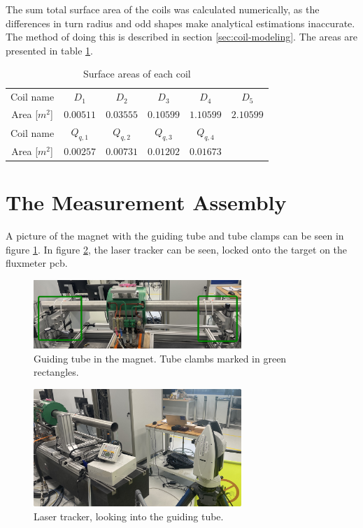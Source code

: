 The sum total surface area of the coils was calculated numerically, as
the differences in turn radius and odd shapes make analytical
estimations inaccurate. The method of doing this is described in 
section \ref{sec:coil-modeling}. The areas are presented in table
\ref{tab:coil-areas}.
\begin{table}[h!]
    \begin{center}
        \begin{tabular}{c c c c c c}
            Coil name & $D_1$ & $D_2$ & $D_3$ & $D_4$ & $D_5$ \\
            Area [$m^2$] & $0.00511$ & $0.03555$ & $0.10599$ & $1.10599$ & $2.10599$ \\
            \hline
            Coil name & $Q_{q,1}$ & $Q_{q,2}$ & $Q_{q,3}$ & $Q_{q,4}$ & \\
            Area [$m^2$] & $0.00257$ & $0.00731$ & $0.01202$ & $0.01673$ &
        \end{tabular}
        \caption{Surface areas of each coil}
        \label{tab:coil-areas}
    \end{center}
\end{table}




\section{The Measurement Assembly}
A picture of the magnet with the guiding tube and tube clamps can be seen in
figure \ref{fig:magnetassembly}. In figure \ref{fig:leica}, the laser tracker
can be seen, locked onto the target on the fluxmeter pcb.

\begin{figure}[!h]
    \centering
    \includegraphics[width=0.7\textwidth]{figs/magnet-assembly}
    \caption{Guiding tube in the magnet. Tube clambs marked in green rectangles.}
    \label{fig:magnetassembly}
\end{figure}

\begin{figure}[!h]
    \centering
    \includegraphics[width=0.7\textwidth]{figs/leica}
    \caption{Laser tracker, looking into the guiding tube.}
    \label{fig:leica}
\end{figure}


